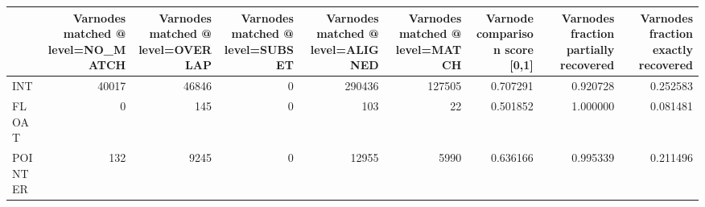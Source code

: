 \begin{tabular}{lrrrrrrrr}
\toprule
{} &  Varnodes matched @ level=NO\_MATCH &  Varnodes matched @ level=OVERLAP &  Varnodes matched @ level=SUBSET &  Varnodes matched @ level=ALIGNED &  Varnodes matched @ level=MATCH &  Varnode comparison score [0,1] &  Varnodes fraction partially recovered &  Varnodes fraction exactly recovered \\
\midrule
INT     &                              40017 &                             46846 &                                0 &                            290436 &                          127505 &                        0.707291 &                               0.920728 &                             0.252583 \\
FLOAT   &                                  0 &                               145 &                                0 &                               103 &                              22 &                        0.501852 &                               1.000000 &                             0.081481 \\
POINTER &                                132 &                              9245 &                                0 &                             12955 &                            5990 &                        0.636166 &                               0.995339 &                             0.211496 \\
\bottomrule
\end{tabular}
